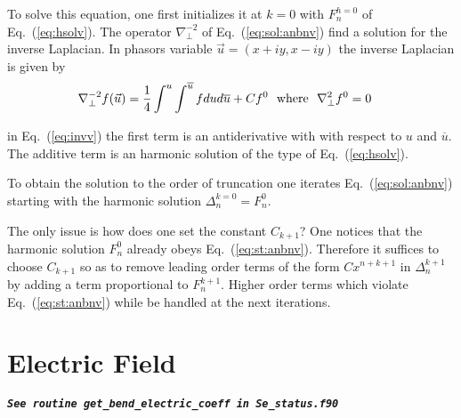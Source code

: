 \documentclass[11pt]{article} %
\def\eq#1{Eq.~(\ref{#1})}
\begin{document}
%
%
To solve this equation, one first initializes it at $k=0$ with 
%
${F}_{n}^{h=
0}$
of \eq{eq:hsolv}. The operator %
${\nabla }_{\perp }^{-2}$ of \eq{eq:sol:anbnv} find a solution for the inverse Laplacian. In phasors variable 
%
$\vec{u}=
\left({x+iy,x-iy}\right)$
the inverse Laplacian is   given by 
%
\begin{eqnarray}{\nabla }_{\perp }^{-2}f(\vec{u})&={1 \over 4}\int_{}^{u}\int_{}^{\overline{u}}f du d\overline{u} + C {f}^{0}~~{\rm w}{\rm h}{\rm e}{\rm r}{\rm e}~~{\nabla }_{\perp }^{2}{f}^{0}=0\label{eq:invv}\end{eqnarray}
%

%

in \eq{eq:invv} the first term is an antiderivative with with respect to $u$ and $ \overline{u}$. The additive term is an harmonic solution of the type of \eq{eq:hsolv}. 

To obtain the solution to the order of truncation one iterates \eq{eq:sol:anbnv} starting with the harmonic solution %
${\Delta }_{n}^{k=
0}=
{F}_{n}^{0}$.

The only issue is how does one set the constant ${C}_{k+1}$? One notices that the harmonic solution  ${F}_{n}^{0}$ already obeys \eq{eq:st:anbnv}. Therefore it suffices to  choose ${C}_{k+1}$ so as to remove leading order terms of the form $C x^{n+k+1}$  in ${\Delta }_{n}^{k+1}$ by adding a term proportional to ${F}_{n}^{k+1}$. Higher order terms which violate \eq{eq:st:anbnv} while be handled at the next iterations.


\section{Electric Field}

\vskip 0.5cm
{\tt \large \bf \it See routine    get_bend_electric_coeff in Se_status.f90}
\vskip 0.5cm
\end{document}
